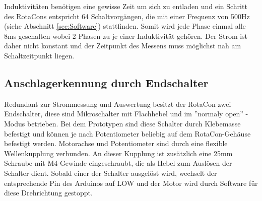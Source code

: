 \documentclass[11pt, titlepage, fleqn]{report}
\begin{document}
				Induktivitäten benötigen eine gewisse Zeit um sich zu entladen und ein Schritt des RotaCons entspricht 64 Schaltvorgängen, die mit einer Frequenz von 500Hz (siehe Abschnitt \ref{sec:Software}) stattfinden. Somit wird jede Phase einmal alle 8ms geschalten wobei 2 Phasen zu je einer Induktivität gehören. Der Strom ist daher nicht konstant und der Zeitpunkt des Messens muss möglichst nah am Schaltzeitpunkt liegen.

				
				
			\newpage
			\subsection{Anschlagerkennung durch Endschalter}
				Redundant zur Strommessung und Auswertung besitzt der RotaCon zwei Endschalter, diese sind Mikroschalter mit Flachhebel und im ''normaly open'' -Modus betrieben. Bei dem Prototypen sind diese Schalter durch Klebemasse befestigt und können je nach Potentiometer beliebig auf dem RotaCon-Gehäuse befestigt werden. Motorachse und Potentiometer sind durch eine flexible Wellenkupplung verbunden. An dieser Kupplung ist zusätzlich eine 25mm Schraube mit M4-Gewinde eingeschraubt, die als Hebel zum Auslösen der Schalter dient. Sobald einer der Schalter ausgelöst wird, wechselt der entsprechende Pin des Arduinos auf LOW und der Motor wird durch Software für diese Drehrichtung gestoppt.
\end{document}
